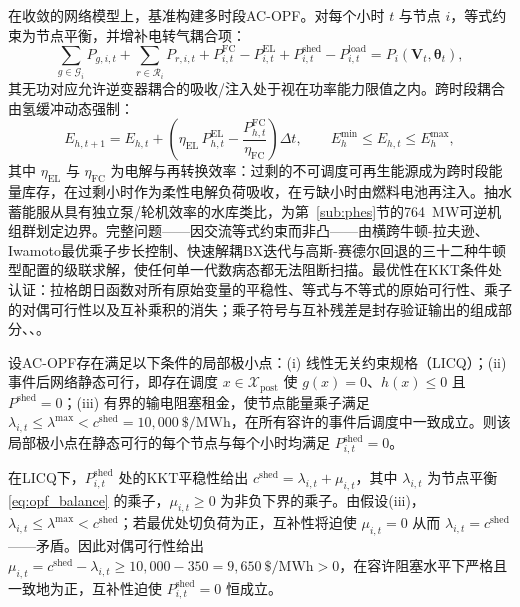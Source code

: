在收敛的网络模型上，基准构建多时段AC-OPF\cite{molzahn2019}。对每个小时 $t$ 与节点 $i$，等式约束为节点平衡，并增补电转气耦合项：
\begin{equation}
\sum_{g \in \mathcal{G}_i} P_{g,i,t} + \sum_{r \in \mathcal{R}_i} P_{r,i,t} + P_{i,t}^{\mathrm{FC}} - P_{i,t}^{\mathrm{EL}} + P_{i,t}^{\mathrm{shed}} - P_{i,t}^{\mathrm{load}} = P_i(\mathbf{V}_t, \boldsymbol{\theta}_t),
\label{eq:opf_balance}
\end{equation}
其无功对应允许逆变器耦合的吸收/注入处于视在功率能力限值之内。跨时段耦合由氢缓冲动态强制：
\begin{equation}
E_{h,t+1} = E_{h,t} + \left(\eta_{\mathrm{EL}}\, P_{h,t}^{\mathrm{EL}} - \frac{P_{h,t}^{\mathrm{FC}}}{\eta_{\mathrm{FC}}}\right) \Delta t, \qquad E_h^{\min} \le E_{h,t} \le E_h^{\max},
\label{eq:h2_storage}
\end{equation}
其中 $\eta_{\mathrm{EL}}$ 与 $\eta_{\mathrm{FC}}$ 为电解与再转换效率：过剩的不可调度可再生能源成为跨时段能量库存，在过剩小时作为柔性电解负荷吸收，在亏缺小时由燃料电池再注入。抽水蓄能服从具有独立泵/轮机效率的水库类比，为第~\ref{sub:phes}节的764~MW可逆机组群划定边界。完整问题——因交流等式约束而非凸——由横跨牛顿-拉夫逊\cite{tinney1967}、Iwamoto最优乘子步长控制、快速解耦BX迭代\cite{stott1974}与高斯-赛德尔回退的三十二种牛顿型配置的级联求解，使任何单一代数病态都无法阻断扫描。最优性在KKT条件处认证：拉格朗日函数对所有原始变量的平稳性、等式与不等式的原始可行性、乘子的对偶可行性以及互补乘积的消失；乘子符号与互补残差是封存验证输出的组成部分\cite{nocedal2006}、\cite{dommel1968}、\cite{wood2013}。

\begin{proposition}[合格局部最优解下的零切负荷]
\label{prop:shed}
设AC-OPF存在满足以下条件的局部极小点：(i) 线性无关约束规格（LICQ）；(ii) 事件后网络静态可行，即存在调度 $x \in \mathcal{X}_{\mathrm{post}}$ 使 $g(x) = 0$、$h(x) \le 0$ 且 $P^{\mathrm{shed}} = 0$；(iii) 有界的输电阻塞租金，使节点能量乘子满足 $\lambda_{i,t} \le \lambda^{\max} < c^{\mathrm{shed}} = 10{,}000\ \text{\$}/\mathrm{MWh}$，在所有容许的事件后调度中一致成立。则该局部极小点在静态可行的每个节点与每个小时均满足 $P_{i,t}^{\mathrm{shed}} = 0$。
\end{proposition}

\begin{IEEEproof}[证明]
在LICQ下，$P_{i,t}^{\mathrm{shed}}$ 处的KKT平稳性给出 $c^{\mathrm{shed}} = \lambda_{i,t} + \mu_{i,t}$，其中 $\lambda_{i,t}$ 为节点平衡 \eqref{eq:opf_balance} 的乘子，$\mu_{i,t} \ge 0$ 为非负下界的乘子。由假设(iii)，$\lambda_{i,t} \le \lambda^{\max} < c^{\mathrm{shed}}$；若最优处切负荷为正，互补性将迫使 $\mu_{i,t} = 0$ 从而 $\lambda_{i,t} = c^{\mathrm{shed}}$——矛盾。因此对偶可行性给出 $\mu_{i,t} = c^{\mathrm{shed}} - \lambda_{i,t} \ge 10{,}000 - 350 = 9{,}650\ \text{\$}/\mathrm{MWh} > 0$，在容许阻塞水平下严格且一致地为正，互补性迫使 $P_{i,t}^{\mathrm{shed}} = 0$ 恒成立。
\end{IEEEproof}


